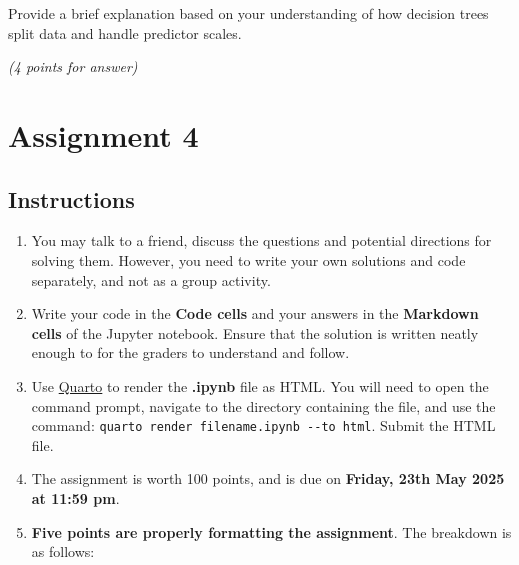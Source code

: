 \documentclass[
  letterpaper,
  DIV=11,
  numbers=noendperiod]{scrreprt}
\begin{document}
Provide a brief explanation based on your understanding of how decision
trees split data and handle predictor scales.

\emph{(4 points for answer)}

\chapter{Assignment 4}\label{assignment-4}

\section*{Instructions}\label{instructions-3}


\begin{enumerate}
\def\labelenumi{\arabic{enumi}.}
\item
  You may talk to a friend, discuss the questions and potential
  directions for solving them. However, you need to write your own
  solutions and code separately, and not as a group activity.
\item
  Write your code in the \textbf{Code cells} and your answers in the
  \textbf{Markdown cells} of the Jupyter notebook. Ensure that the
  solution is written neatly enough to for the graders to understand and
  follow.
\item
  Use
  \href{https://quarto.org/docs/output-formats/html-basics.html}{Quarto}
  to render the \textbf{.ipynb} file as HTML. You will need to open the
  command prompt, navigate to the directory containing the file, and use
  the command: \texttt{quarto\ render\ filename.ipynb\ -\/-to\ html}.
  Submit the HTML file.
\item
  The assignment is worth 100 points, and is due on \textbf{Friday, 23th
  May 2025 at 11:59 pm}.
\item
  \textbf{Five points are properly formatting the assignment}. The
  breakdown is as follows:


\end{enumerate}
\end{document}
